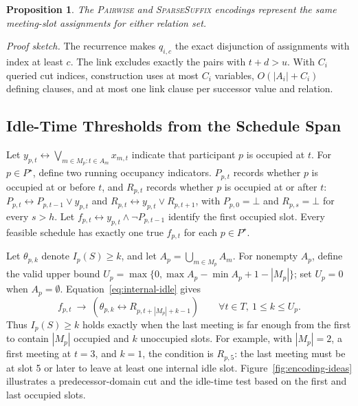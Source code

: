 \documentclass[conference,a4paper]{IEEEtran}
\newtheorem{proposition}{Proposition}
\begin{document}
\begin{proposition}
\label{prop:suffix-equivalence}
The \mbox{\textnormal{\textsc{Pairwise}}} and \mbox{\textnormal{\textsc{SparseSuffix}}} encodings represent the same meeting-slot assignments for either relation set.
\end{proposition}
\emph{Proof sketch.} The recurrence makes $q_{i,c}$ the exact disjunction of assignments with index at least $c$.  The link excludes exactly the pairs with $t+d>u$.  With $C_i$ queried cut indices, construction uses at most $C_i$ variables, $O(|A_i|+C_i)$ defining clauses, and at most one link clause per successor value and relation.

\subsection{Idle-Time Thresholds from the Schedule Span}

Let $y_{p,t}\leftrightarrow\bigvee_{m\in M_p:t\in A_m}x_{m,t}$ indicate that participant $p$ is occupied at $t$.  For $p\in P^\star$, define two running occupancy indicators.  $P_{p,t}$ records whether $p$ is occupied at or before $t$, and $R_{p,t}$ records whether $p$ is occupied at or after $t$: $P_{p,t}\leftrightarrow P_{p,t-1}\lor y_{p,t}$ and $R_{p,t}\leftrightarrow y_{p,t}\lor R_{p,t+1}$, with $P_{p,0}=\bot$ and $R_{p,s}=\bot$ for every $s>h$.  Let $f_{p,t}\leftrightarrow y_{p,t}\land\neg P_{p,t-1}$ identify the first occupied slot.  Every feasible schedule has exactly one true $f_{p,t}$ for each $p\in P^\star$.

Let $\theta_{p,k}$ denote $I_p(S)\geq k$, and let $A_p=\bigcup_{m\in M_p}A_m$.  For nonempty $A_p$, define the valid upper bound $U_p=\max\{0,\max A_p-\min A_p+1-|M_p|\}$; set $U_p=0$ when $A_p=\emptyset$.  Equation~\eqref{eq:internal-idle} gives
\begin{equation}
f_{p,t}\ \rightarrow\
\left(\theta_{p,k}\leftrightarrow R_{p,t+|M_p|+k-1}\right)
\qquad \forall t\in T,\ 1\le k\le U_p.
\label{eq:span-threshold}
\end{equation}
Thus $I_p(S)\ge k$ holds exactly when the last meeting is far enough from the first to contain $|M_p|$ occupied and $k$ unoccupied slots.  For example, with $|M_p|=2$, a first meeting at $t=3$, and $k=1$, the condition is $R_{p,5}$: the last meeting must be at slot 5 or later to leave at least one internal idle slot. Figure~\ref{fig:encoding-ideas} illustrates a predecessor-domain cut and the idle-time test based on the first and last occupied slots.
\end{document}
